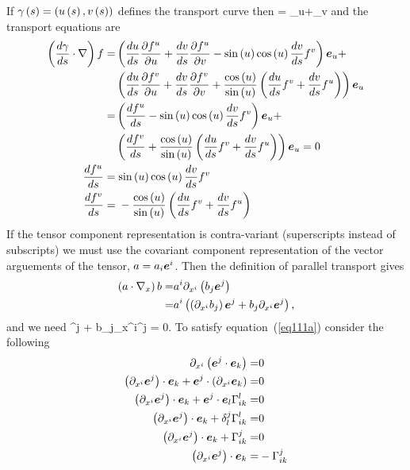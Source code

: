 If ${\gamma}\left ( {s} \right ) = \left ( {{u}\left ( {s} \right ),{v}\left ( {s} \right )} \right )$ defines the transport curve then
\be
	 = \eb_{u}+\eb_{v}
\ee
and the transport equations are
\begin{align}
	\left ( {\displaystyle\frac{d{\gamma}}{d{s}}{}\cdot\nabla} \right ) f =& \left ( {\displaystyle\frac{d{u}}{d{s}}{}\displaystyle\frac{\partial{f^{u}}}{\partial{u}}+\displaystyle\frac{d{v}}{d{s}}{}\displaystyle\frac{\partial{f^{u}}}{\partial{v}}
	                                            -{\sin}\left ( {u} \right ){\cos}\left ( {u} \right )\displaystyle\frac{d{v}}{d{s}}{}f^{v}} \right )\bm{e}_{u}+\nonumber \\
	                                          & \left ( {\displaystyle\frac{d{u}}{d{s}}{}\displaystyle\frac{\partial{f^{v}}}{\partial{u}}+\displaystyle\frac{d{v}}{d{s}}{}\displaystyle\frac{\partial{f^{v}}}{\partial{v}}
	                                            +\displaystyle\frac{{\cos}\left ( {u} \right )}{{\sin}\left ( {u} \right )}
	                                             \left ( {\displaystyle\frac{d{u}}{d{s}}{}f^{v}+\displaystyle\frac{d{v}}{d{s}}{}f^{u}} \right )} \right )\bm{e}_{u}  \nonumber \\
	                                         =& \left ( {\displaystyle\frac{d{f^{u}}}{d{s}}{}
	                                            -{\sin}\left ( {u} \right ){\cos}\left ( {u} \right )\displaystyle\frac{d{v}}{d{s}}{}f^{v}} \right )\bm{e}_{u}+\nonumber \\
	                                          & \left ( {\displaystyle\frac{d{f^{v}}}{d{s}}{}
	                                            +\displaystyle\frac{{\cos}\left ( {u} \right )}{{\sin}\left ( {u} \right )}
	                                             \left ( {\displaystyle\frac{d{u}}{d{s}}{}f^{v}+\displaystyle\frac{d{v}}{d{s}}{}f^{u}} \right )} \right )\bm{e}_{u}  = 0  \\
	 \displaystyle\frac{d{f^{u}}}{d{s}}{} =& \;{\sin}\left ( {u} \right ){\cos}\left ( {u} \right )\displaystyle\frac{d{v}}{d{s}}{}f^{v} \\
	 \displaystyle\frac{d{f^{v}}}{d{s}}{} =& \;-\displaystyle\frac{{\cos}\left ( {u} \right )}{{\sin}\left ( {u} \right )}
	                                             \left ( {\displaystyle\frac{d{u}}{d{s}}{}f^{v}+\displaystyle\frac{d{v}}{d{s}}{}f^{u}} \right )
\end{align}
If the tensor component representation is contra-variant (superscripts instead of subscripts) we must use the covariant component representation of
the vector arguements of the tensor, $a = a_{i}\bm{e}^{i}$.  Then the definition of parallel transport gives
\begin{align}
	\left ( {a\cdot\nabla_{x}} \right ) b =& a^{i}\partial_{x^{i}}\left ( {b_{j}\bm{e}^{j}} \right ) \nonumber \\
	                          =& a^{i}\left ( {\left ( {\partial_{x^{i}}b_{j}} \right )\bm{e}^{j} + b_{j}\partial_{x^{i}}\bm{e}^{j}} \right ),
\end{align}
and we need
\be
	\eb^{j} + b_{j}\partial_{x^{i}}\eb^{j} = 0. \label{eq111a}
\ee
To satisfy equation~(\ref{eq111a}) consider the following
\begin{align}
	\partial_{x^{i}}\left ( {\bm{e}^{j}\cdot\bm{e}_{k}} \right ) =& 0 \nonumber \\
	\left ( {\partial_{x^{i}}\bm{e}^{j}} \right )\cdot\bm{e}_{k} + \bm{e}^{j}\cdot\left ( {\partial_{x^{i}}\bm{e}_{k}} \right ) =& 0  \nonumber \\
	\left ( {\partial_{x^{i}}\bm{e}^{j}} \right )\cdot\bm{e}_{k} + \bm{e}^{j}\cdot\bm{e}_{l}\Gamma_{ik}^{l} =& 0 \nonumber \\
	\left ( {\partial_{x^{i}}\bm{e}^{j}} \right )\cdot\bm{e}_{k} + \delta_{l}^{j}\Gamma_{ik}^{l} =& 0 \nonumber \\
	\left ( {\partial_{x^{i}}\bm{e}^{j}} \right )\cdot\bm{e}_{k} + \Gamma_{ik}^{j} =& 0 \nonumber \\
	\left ( {\partial_{x^{i}}\bm{e}^{j}} \right )\cdot\bm{e}_{k} =& -\Gamma_{ik}^{j}
\end{align}
